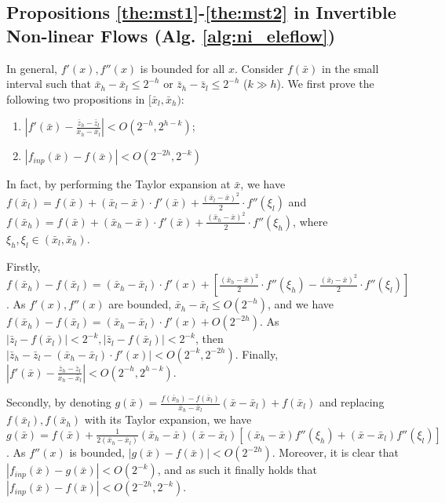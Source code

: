 \documentclass{article}
\newcommand{\quant}[1]{\bar{#1}}
\begin{document}
\subsection{Propositions \ref{the:mst1}-\ref{the:mst2} in Invertible Non-linear Flows (Alg. \ref{alg:ni_eleflow})}

In general, $f'(x), f''(x)$ is bounded for all $x$. Consider $f(\quant{x})$ in the small interval such that $\quant{x}_h - \quant{x}_l \le 2^{-h}$ or $\quant{z}_h - \quant{z}_l \le 2^{-h}$ ($k \gg h$). We first prove the following two propositions in $[\quant{x}_l, \quant{x}_h)$:
\begin{enumerate}
    \item $|f'(\quant{x}) - \frac{\quant{z}_h - \quant{z}_l}{\quant{x}_h - \quant{x}_l}| < O(2^{-h}, 2^{h-k})$;
    \item $|f_{inp}(\quant{x}) - f(\quant{x})| < O(2^{-2h}, 2^{-k})$
\end{enumerate}

In fact, by performing the Taylor expansion at $\quant{x}$, we have $f(\quant{x}_l) = f(\quant{x}) + (\quant{x}_l - \quant{x}) \cdot f'(\quant{x}) + \frac{(\quant{x}_l - \quant{x})^2}{2} \cdot f''(\xi_l)$ and $f(\quant{x}_h) = f(\quant{x}) + (\quant{x}_h - \quant{x}) \cdot f'(\quant{x}) + \frac{(\quant{x}_h - \quant{x})^2}{2} \cdot f''(\xi_h)$, where $\xi_h, \xi_l \in (\quant{x}_l, \quant{x}_h)$. 

Firstly, $f(\quant{x}_h) - f(\quant{x}_l) = (\quant{x}_h - \quant{x}_l) \cdot f'(x) + [\frac{(\quant{x}_h - \quant{x})^2}{2} \cdot f''(\xi_h) - \frac{(\quant{x}_l - \quant{x})^2}{2} \cdot f''(\xi_l)]$. As $f'(x), f''(x)$ are bounded, $\quant{x}_h - \quant{x}_l \le O(2^{-h})$, and we have $f(\quant{x}_h) - f(\quant{x}_l) = (\quant{x}_h - \quant{x}_l) \cdot f'(x) + O(2^{-2h})$. As $|\quant{z}_l - f(\quant{x}_l)| < 2^{-k}, |\quant{z}_l - f(\quant{x}_l)| < 2^{-k}$, then $|\quant{z}_h - \quant{z}_l - (\quant{x}_h - \quant{x}_l) \cdot f'(x)| < O(2^{-k}, 2^{-2h})$. Finally, $|f'(\quant{x}) - \frac{\quant{z}_h - \quant{z}_l}{\quant{x}_h - \quant{x}_l}| < O(2^{-h}, 2^{h-k})$.

Secondly, by denoting $g(\quant{x}) = \frac{f(\quant{x}_h) - f(\quant{x}_l)}{\quant{x}_h - \quant{x}_l} (\quant{x} - \quant{x}_l) + f(\quant{x}_l)$ and replacing $f(\quant{x}_l), f(\quant{x}_h)$ with its Taylor expansion, we have $g(\quant{x}) = f(\quant{x}) + \frac{1}{2(\quant{x}_h - \quant{x}_l)} (\quant{x}_h - \quant{x}) (\quant{x} - \quant{x}_l) [(\quant{x}_h - \quant{x}) f''(\xi_h) + (\quant{x} - \quant{x}_l) f''(\xi_l)]$. As $f''(x)$ is bounded, $|g(\quant{x}) - f(\quant{x})| < O(2^{-2h})$. Moreover, it is clear that $|f_{inp}(\quant{x}) - g(\quant{x})| < O(2^{-k})$, and as such it finally holds that $|f_{inp}(\quant{x}) - f(\quant{x})| < O(2^{-2h}, 2^{-k})$.
\end{document}
